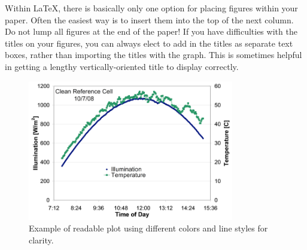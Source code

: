 \documentclass[conference]{pvsctran}
\begin{document}
Within \LaTeX, there is basically only one option for placing figures
within your paper.  Often the easiest way is to insert them into the
top of the next column.
Do not lump all figures at the end of the paper!
If you have difficulties with the titles on your figures, you can always elect to add in the titles as separate text boxes, rather than importing the titles with the graph. This is sometimes helpful in getting a lengthy vertically-oriented title to display correctly.


\begin{figure}
\centering
\includegraphics[width=9cm]{image1.png}
\caption{Example of readable plot using different colors and line styles for clarity.}
\end{figure}
\end{document}
